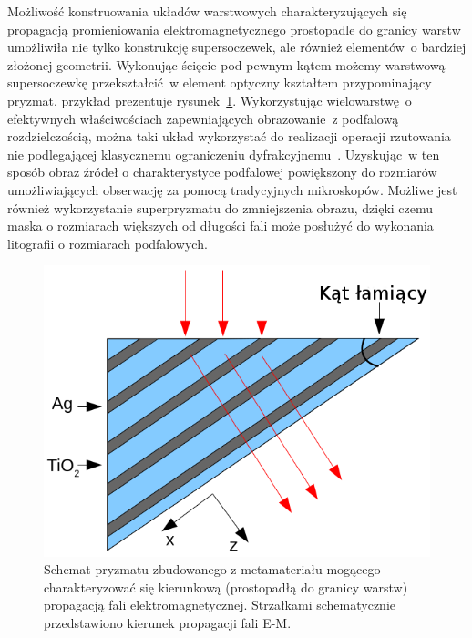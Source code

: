 Możliwość konstruowania układów warstwowych charakteryzujących się propagacją promieniowania elektromagnetycznego prostopadle do granicy warstw umożliwiła nie tylko konstrukcję supersoczewek, ale również elementów~o bardziej złożonej geometrii. Wykonując ścięcie pod pewnym kątem możemy warstwową supersoczewkę przekształcić~w element optyczny kształtem przypominający pryzmat, przykład prezentuje rysunek~\ref{fig:prism-schema}. Wykorzystując wielowarstwę~o efektywnych właściwościach zapewniających obrazowanie~z podfalową rozdzielczością, można taki układ wykorzystać do realizacji operacji rzutowania nie podlegającej klasycznemu ograniczeniu dyfrakcyjnemu~\cite{prism2010}. Uzyskując~w ten sposób obraz źródeł o charakterystyce podfalowej powiększony do rozmiarów umożliwiających obserwację za pomocą tradycyjnych mikroskopów. Możliwe jest również wykorzystanie superpryzmatu do zmniejszenia obrazu, dzięki czemu maska o rozmiarach większych od długości fali może posłużyć do wykonania litografii o rozmiarach podfalowych.

			\begin{figure}[tbH]
				\includegraphics[width=\textwidth]{images/multilayer/prism.png}
				\caption{Schemat pryzmatu zbudowanego z metamateriału mogącego charakteryzować się kierunkową (prostopadłą do granicy warstw) propagacją fali elektromagnetycznej. Strzałkami schematycznie przedstawiono kierunek propagacji fali E-M.}
				\label{fig:prism-schema}
			\end{figure}


